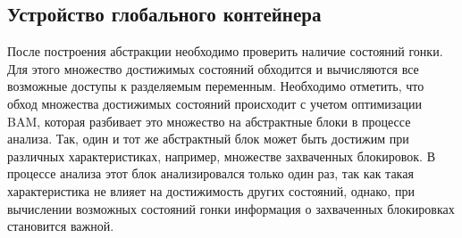 %
%
%

\subsection{Устройство глобального контейнера} \label{subsect_impl_global_storage}

После построения абстракции необходимо проверить наличие состояний гонки.
Для этого множество достижимых состояний обходится и вычисляются все возможные доступы к разделяемым переменным.
Необходимо отметить, что обход множества достижимых состояний происходит с учетом оптимизации BAM, которая разбивает это множество на абстрактные блоки в процессе анализа.
Так, один и тот же абстрактный блок может быть достижим при различных характеристиках, например, множестве захваченных блокировок. 
В процессе анализа этот блок анализировался только один раз, так как такая характеристика не влияет на достижимость других состояний, однако, при вычислении возможных состояний гонки информация о захваченных блокировках становится важной.


